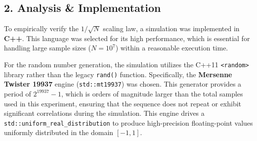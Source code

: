 \documentclass{article}
\begin{document}
\subsection*{2. Analysis \& Implementation}
To empirically verify the $1/\sqrt{N}$ scaling law, a simulation was implemented in \textbf{C++}. This language was selected for its high performance, which is essential for handling large sample sizes ($N=10^7$) within a reasonable execution time.

For the random number generation, the simulation utilizes the C++11 \texttt{<random>} library rather than the legacy \texttt{rand()} function. Specifically, the \textbf{Mersenne Twister 19937} engine (\texttt{std::mt19937}) was chosen. This generator provides a period of $2^{19937}-1$, which is orders of magnitude larger than the total samples used in this experiment, ensuring that the sequence does not repeat or exhibit significant correlations during the simulation. This engine drives a \texttt{std::uniform\_real\_distribution} to produce high-precision floating-point values uniformly distributed in the domain $[-1, 1]$.
\end{document}
